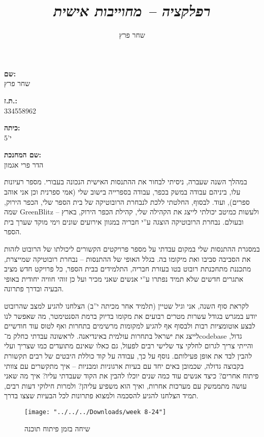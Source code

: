 \documentclass[]{article}
\author{שחר פרץ}
\title{\textit{רפלקציה – מחוייבות אישית}}
\begin{document}
    \maketitle
    
    \large
    \begin{multicols}{4}
        \centering\textbf{שם: }\\שחר פרץ 
        \columnbreak
        
        \textbf{ת.ז.: }\\334558962
        \columnbreak
        
        \textbf{כיתה: }\\י'5
        \columnbreak
        
        \textbf{שם המחנכת: }\\הדר פרי אגמון
    \end{multicols}
    
    
    במהלך השנה שעברה, ניסיתי לבחור את ההתנסות האישית הנכונה בעבורי. מספר רעיונות עלו, ביניהם עבודה במשק בכפר, עבודה בספרייה בישוב שלי (אמי ספרנית וכן אני אוהב ספרים), ועוד. לבסוף, החלטתי ללכת לנבחרת הרובוטיקה של בית הספר שלי, הכפר הירוק, שמה GreenBlitz – ולעשות כמיטב יכולתי לייצג את הקהילה שלי, קהילת הכפר הירוק, בארץ ובעולם. נבחרת הרובוטיקה הוצגה ע''י חבריה במגוון אירועים שונים וימי מוקד שערך בית הספר. 
    
    במסגרת ההתנסות שלי במקום עבדתי על מספר פרויקטים הקשורים ליכולתו של הרובוט לזהות את הסביבה סביבו ואת מיקומו בה. בגלל האופי של ההתנסות – נבחרת רובוטיקה שמייצרת, מתכננת מתחכנתת רובוט בטו בעזרת חבריה, התלמידים בבית הספר, כל פרויקט חדש מציב אתגרים חדשים שלא תמיד נפתרו ע''י אנשים שאני מכיר ועל כן זוהי חוויה יחודית באופי הבעיה ובדרך פתרונה. 
    
    לקראת סוף השנה, אני וגיל שטיין (תלמיד אחר מכיתה י''ב) הצלחנו להגיע למצב שהרובוט יודע במגרש בגודל עשרות מטרים רבועים את מקומו בדיוק ברמת הסנטימטר, מה שאפשר לנו לבצע אוטומציות רבות ולבסוף אף להגיע למקומות מרשימים בתחרות ואף לטוס עוד חודשיים לייצג את ישראל בתחרות עולמית באינדיאנה. לראשונה עבדתי כחלק מ־codebase גדול, והייתי צריך לגרום לחלקי צד שלישי רבים לפעול, גם כאלו שאינם מתועדים כמו שצריך ועלי להבין לבד את אופן פעילותם. נוסף על כך, עבודה על קוד כוללת היבטים של רבים תקשורת בקבוצה גדולה, שכמובן באים יחד עם בעיות ארגוניות ומבניות – איך מתקשרים עם צוותי פיתוח אחרים? כיצד אנשים עוד כמה שנים יוכלו להבין את הקוד שעבדתי עליו? איך מה שאני עושה מתממשק עם מערכות אחרות, ואיך הוא משפיע עליהן? ולמרות חילוקי דעות רבים, תמיד הצלחנו להגיע להסכמה ולמצוא פתרונות לכל הבעיות שצצו בדרך. 
    
    \begin{figure}[h]
        \centering
        \texttt{[image: "../../../Downloads/week 8-24"]}
        \caption{שיחה בזמן פיתוח תוכנה}
        \label{fig:week-8-24}
    \end{figure}
    
\end{document}
